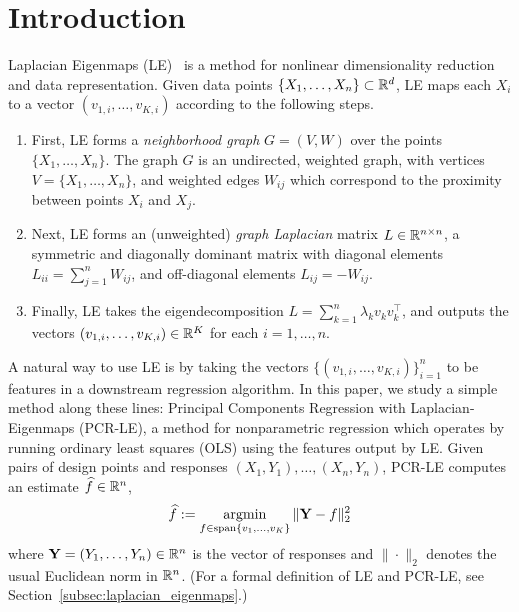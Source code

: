 \section{Introduction}
\label{sec:introduction}

Laplacian Eigenmaps (LE)~\citep{belkin03a} is a method for nonlinear dimensionality reduction and data representation. Given data points $\{X_1,\ldots,X_n\} \subset \mathbb{R}^d$, LE maps each $X_i$ to a vector $(v_{1,i},\ldots,v_{K,i})$ according to the following steps.
\begin{enumerate}
	\item First, LE forms a \emph{neighborhood graph} $G = (V,W)$ over the points $\{X_1,\ldots,X_n\}$. The graph $G$ is an undirected, weighted graph, with vertices $V = \{X_1,\ldots,X_n\}$, and weighted edges $W_{ij}$ which correspond to the proximity between points $X_i$ and $X_j$.
	\item Next, LE forms an (unweighted) \emph{graph Laplacian} matrix $L \in \mathbb{R}^{n \times n}$, a symmetric and diagonally dominant matrix with diagonal elements $L_{ii} = \sum_{j = 1}^{n} W_{ij}$, and off-diagonal elements $L_{ij} = -W_{ij}$. 
	\item Finally, LE takes the eigendecomposition $L = \sum_{k = 1}^{n} \lambda_k v_k v_k^{\top}$, and outputs the vectors $(v_{1,i},\ldots,v_{K,i}) \in \mathbb{R}^K$ for each $i = 1,\ldots,n$.
\end{enumerate} 
A natural way to use LE is by taking the vectors $\{(v_{1,i},\ldots,v_{K,i})\}_{i = 1}^{n}$ to be features in a downstream regression algorithm. In this paper, we study a simple method along these lines: Principal Components Regression with Laplacian-Eigenmaps (PCR-LE), a method for nonparametric regression which operates by running ordinary least squares (OLS) using the features output by LE. Given pairs of design points and responses $(X_1,Y_1),\ldots, (X_n,Y_n)$, PCR-LE computes an estimate $\widehat{f} \in \mathbb{R}^n$,
\begin{equation}
\label{eqn:pcr-le}
\widehat{f} := \mathop{\mathrm{argmin}}_{f \in \mathrm{span}\{v_1,\ldots,v_K\}} \|{\bf Y} - f\|_2^2
\end{equation}
where ${\bf Y} = (Y_1,\ldots,Y_n) \in \mathbb{R}^n$ is the vector of responses and $\|\cdot\|_2$ denotes the usual Euclidean norm in $\mathbb{R}^n$. (For a formal definition of LE and PCR-LE, see Section~\ref{subsec:laplacian_eigenmaps}.)

